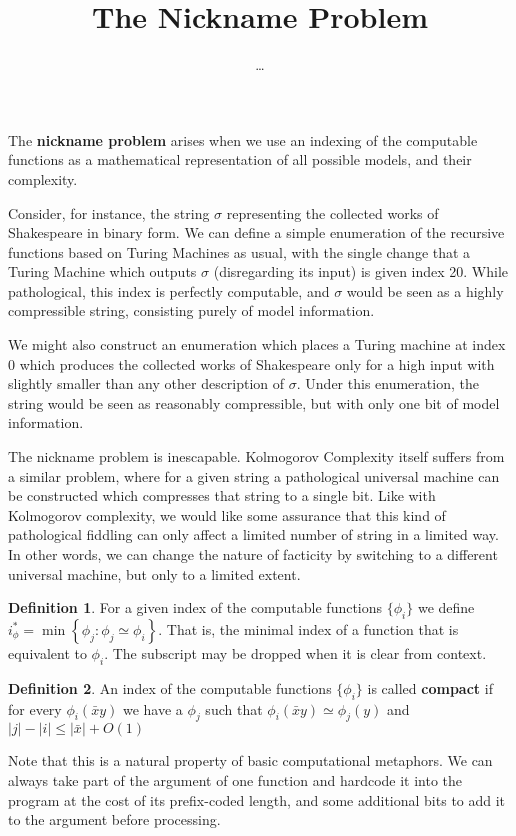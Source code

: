 \documentclass{article}
\title{The Nickname Problem}
\date{\ldots}
\theoremstyle{definition}
\newtheorem*{dfn}{Definition}
\begin{document}
\maketitle
The \textbf{nickname problem} arises when we use an indexing of the computable functions as a mathematical representation of all possible models, and their complexity. 

Consider, for instance, the string $\sigma$ representing the collected works of Shakespeare in binary form. We can define a simple enumeration of the recursive functions based on Turing Machines as usual, with the single change that a Turing Machine which outputs $\sigma$ (disregarding its input) is given index 20. While pathological, this index is perfectly computable, and $\sigma$ would be seen as a highly compressible string, consisting purely of model information. 

We might also construct an enumeration which places a Turing machine at index 0 which produces the collected works of Shakespeare only for a high input with slightly smaller than any other description of $\sigma$. Under this enumeration, the string would be seen as reasonably compressible, but with only one bit of model information.

The nickname problem is inescapable. Kolmogorov Complexity itself suffers from a similar problem, where for a given string a pathological universal machine can be constructed which compresses that string to a single bit. Like with Kolmogorov complexity, we would like some assurance that this kind of pathological fiddling can only affect a limited number of string in a limited way. In other words, we can change the nature of facticity by switching to a different universal machine, but only to a limited extent.

\begin{dfn}
For a given index of the computable functions $\{\phi_i\}$ we define $i^*_\phi = \min\left\{\phi_j : \phi_j \simeq \phi_i\right\}$. That is, the minimal index of a function that is equivalent to $\phi_i$. The subscript may be dropped when it is clear from context.
\end{dfn}

\begin{dfn}
An index of the computable functions $\{\phi_i\}$ is called \textbf{compact} if for every 
$\phi_i(\bar{x}y)$ we have a $\phi_j$ such that $\phi_i(\bar{x}y) \simeq \phi_j(y)$ and  $|j| - |i| \leq |\bar{x}| + O(1)$
\end{dfn}

Note that this is a natural property of basic computational metaphors. We can always take part of the argument of one function and hardcode it into the program at the cost of its prefix-coded length, and some additional bits to add it to the argument before processing. 
\end{document}
